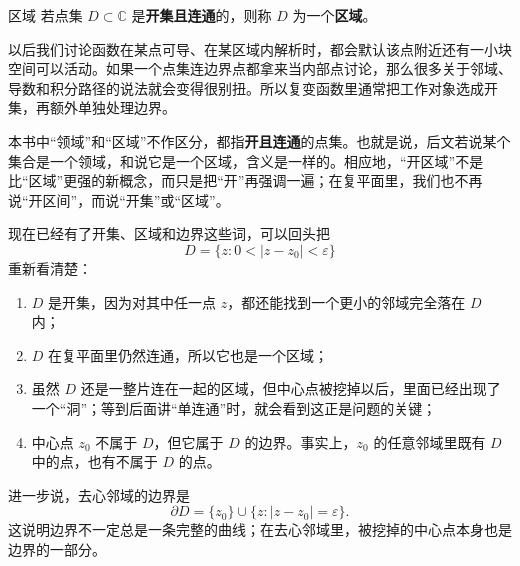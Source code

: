 \begin{dingliyi}{区域}{}
若点集 $D\subset\mathbb{C}$ 是\textbf{开集且连通}的，则称 $D$ 为一个\textbf{区域}。
\end{dingliyi}

\begin{tishi}[为什么区域一定要要求``开'']
以后我们讨论函数在某点可导、在某区域内解析时，都会默认该点附近还有一小块空间可以活动。如果一个点集连边界点都拿来当内部点讨论，那么很多关于邻域、导数和积分路径的说法就会变得很别扭。所以复变函数里通常把工作对象选成开集，再额外单独处理边界。
\end{tishi}

\begin{zhu}{}{}
本书中``领域''和``区域''不作区分，都指\textbf{开且连通}的点集。也就是说，后文若说某个集合是一个领域，和说它是一个区域，含义是一样的。相应地，``开区域''不是比``区域''更强的新概念，而只是把``开''再强调一遍；在复平面里，我们也不再说``开区间''，而说``开集''或``区域''。
\end{zhu}

\begin{tishi}[回头看去心邻域]
现在已经有了开集、区域和边界这些词，可以回头把
\[
    D=\{z:0<|z-z_0|<\varepsilon\}
\]
重新看清楚：
\begin{enumerate}
    \item $D$ 是开集，因为对其中任一点 $z$，都还能找到一个更小的邻域完全落在 $D$ 内；
    \item $D$ 在复平面里仍然连通，所以它也是一个区域；
    \item 虽然 $D$ 还是一整片连在一起的区域，但中心点被挖掉以后，里面已经出现了一个``洞''；等到后面讲``单连通''时，就会看到这正是问题的关键；
    \item 中心点 $z_0$ 不属于 $D$，但它属于 $D$ 的边界。事实上，$z_0$ 的任意邻域里既有 $D$ 中的点，也有不属于 $D$ 的点。
\end{enumerate}
进一步说，去心邻域的边界是
\[
    \partial D=\{z_0\}\cup\{z:|z-z_0|=\varepsilon\}.
\]
这说明边界不一定总是一条完整的曲线；在去心邻域里，被挖掉的中心点本身也是边界的一部分。
\end{tishi}

